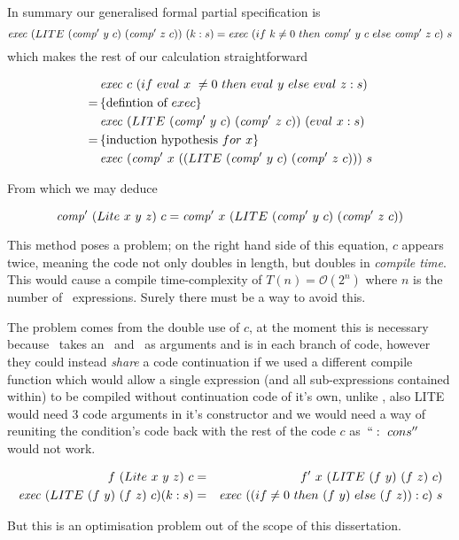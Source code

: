 \documentclass {article}
\begin{document}
In summary our generalised formal partial specification is
\begin{equation*}
	\Exec (LITE\ (\Compp  y\ c)\ (\Compp  z\ c) )\ (k:s) 
= \Exec (if\ k \not= 0\ then\ \Compp  y\ c\ else\ \Compp  z\ c)\ s 
\end{equation*}
which makes the rest of our calculation straightforward

\begin{align*}
	&\mathit{exec\ } c\ (if\ eval\ x\ \not= 0\ then\ eval\ y\ else\ eval\ z : s) \\
	=\, & \{\mbox{defintion of}\ exec\} \\
	&\mathit{exec\ } (LITE\ (\mathit{comp'\ }  y\ c)\ (\mathit{comp'\ }  z\ c) )\ (eval\ x : s) \\
	=\, & \{\mbox{induction hypothesis}\ for\ x\} \\
	&\mathit{exec\ } (\mathit{comp'\ }  x\ ((LITE\ (\mathit{comp'\ }  y\ c)\ (\mathit{comp'\ }  z\ c)))\ s
\end{align*}

From which we may deduce 

	\[ \mathit{comp'\ }  (Lite\ x\ y\ z)\ c 
		= \mathit{comp'\ }  x\ (LITE\ (\mathit{comp'\ }  y\ c)\ (\mathit{comp'\ }  z\ c)) \]

This method poses a problem;
on the right hand side of this equation,
$c$ appears twice, meaning the code not only 
doubles in length, but doubles in \emph{compile time}.
This would cause a compile time-complexity of
\( T(n) = \mathcal{O}(2^n) \)
where $n$ is the number of \lite\ expressions.
Surely there must be a way to avoid this.

The problem comes from the double use of $c$,
at the moment this is necessary because \compp\
takes an \expr\ and \code\ as arguments and is in
each branch of code,
however they could instead \emph{share}
a code continuation if we used a different compile function
which would allow a single expression 
(and all sub-expressions contained within)  
to be compiled without continuation code of it's own,
unlike \compp, also LITE would need 3 code arguments in
it's constructor and we would need a way of 
reuniting the condition's code back with the rest of the code $c$
as~$``:\ cons''$ would not work.

\begin{eqnarray*}
f\ (Lite\ x\ y\ z)\ c &=& f'\ x\ (LITE\ (f\ y)\ (f\ z)\ c) \\
\mathit{exec\ } (LITE\ (f\ y)\ (f\ z)\ c) (k : s) 
&=& \mathit{exec\ } ((if \not=0\ then\ (f\ y)\ else\ (f\ z)) : c)\ s 
\end{eqnarray*}

But this is an optimisation problem out of the scope of this dissertation.
\end{document}
